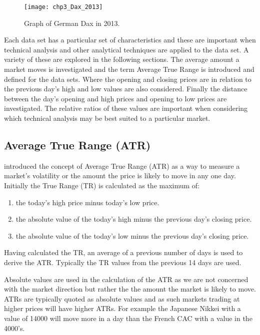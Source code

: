 \begin{figure}[tbph]
\centering
\texttt{[image: chp3\_Dax\_2013]}
\caption[Graph of Dax in 2013.]{Graph of German Dax in 2013.}
\label{fig:Dax2013}
\end{figure}

Each data set has a particular set of characteristics and these are important when technical analysis and other analytical techniques are applied to the data set. A variety of these are explored in the following sections. The average amount a market moves is investigated and the term Average True Range is introduced and defined for the data sets. Where the opening and closing prices are in relation to the previous day's high and low values are also considered. Finally the distance between the day's opening and high prices and opening to low prices are investigated. The relative ratios of these values are important when considering which technical analysis may be best suited to a particular market.

\subsection{Average True Range (ATR)}
\label{chp3:atr}
\cite{wilder1978new} introduced the concept of Average True Range (ATR) as a way to measure a market's volatility or the amount the price is likely to move in any one day. Initially the True Range (TR) is calculated as the maximum of:
\begin{enumerate}
\item the today's high price minus today's low price.
\item the absolute value of the today's high minus the previous day's closing price.
\item the absolute value of the today's low minus the previous day's closing price.
\end{enumerate}
Having calculated the TR, an average of a previous number of days is used to derive the ATR. Typically the TR values from the previous 14 days are used.

Absolute values are used in the calculation of the ATR as we are not concerned with the market direction but rather the the amount the market is likely to move. ATRs are typically quoted as absolute values and as such markets trading at higher prices will have higher ATRs. For example the Japanese Nikkei with a value of 14000 will move more in a day than the French CAC with a value in the 4000's. 

